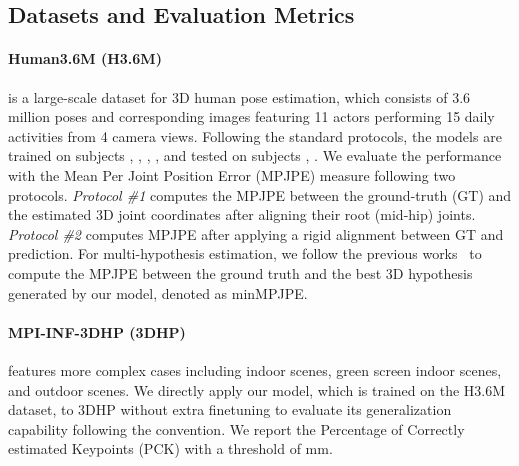 \documentclass[10pt,twocolumn,letterpaper]{article}
\begin{document}
\subsection{Datasets and Evaluation Metrics}
\label{subsec:dataset_metric}
\paragraph{Human3.6M (H3.6M)~\cite{h36m_pami}} is a large-scale dataset for 3D human pose estimation, which consists of 3.6 million poses and corresponding images featuring 11 actors performing 15 daily activities from 4 camera views. Following the standard protocols, the models are trained on subjects , , , ,  and tested on subjects , . We evaluate the performance with the Mean Per Joint Position Error (MPJPE) measure following two protocols. \textit{Protocol \#1} computes the MPJPE between the ground-truth (GT) and the estimated 3D joint coordinates after aligning their root (mid-hip) joints. \textit{Protocol \#2} computes MPJPE after applying a rigid alignment between GT and prediction. For multi-hypothesis estimation, we follow the previous works~\cite{jahangiri2017generating, Li_2019_CVPR, li2020weakly, wehrbein2021probabilistic} to compute the MPJPE between the ground truth and the best 3D hypothesis generated by our model, denoted as minMPJPE.

\vspace{-1.25em}
\paragraph{MPI-INF-3DHP (3DHP)~\cite{mono-3dhp2017}} features more complex cases including indoor scenes, green screen indoor scenes, and outdoor scenes. We directly apply our model, which is trained on the H3.6M dataset, to 3DHP without extra finetuning to evaluate its generalization capability following the convention. We report the Percentage of Correctly estimated Keypoints (PCK) with a threshold of  mm.
\end{document}
